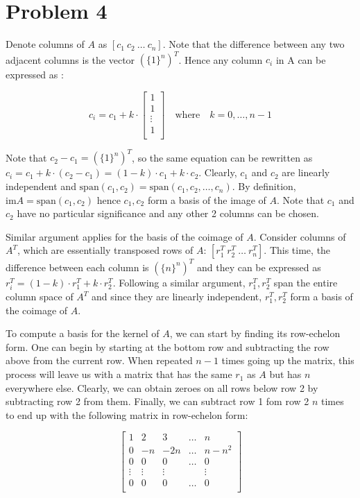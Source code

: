 \documentclass[10pt,letter]{article}
\begin{document}
\pagebreak

\section*{Problem 4}

Denote columns of $A$ as $\left[c_1\ c_2\ \ldots\ c_n\right]$. Note that the difference between any two adjacent columns is the vector $(\{1\}^n)^T$. Hence any column $c_i$ in A can be expressed as :

\[
c_i = c_1 + k \cdot 
\left[ {\begin{array}{c}
 1 \\
 1 \\
 \vdots \\
 1 \\
\end{array} } \right]
\quad \textrm{where} \quad k=0,\ldots ,n-1
\]

Note that $c_2 - c_1 = (\{1\}^n)^T$, so the same equation can be rewritten as $c_i = c_1 + k \cdot (c_2 - c_1) = (1 - k) \cdot c_1 + k \cdot c_2$. Clearly, $c_1$ and $c_2$ are linearly independent and $\textrm{span}(c_1, c_2) = \textrm{span}(c_1, c_2, \ldots, c_n)$. By definition, $\textrm{im}A = \textrm{span}(c_1, c_2)$ hence $c_1, c_2$ form a basis of the image of $A$. Note that $c_1$ and $c_2$ have no particular significance and any other 2 columns can be chosen.

Similar argument applies for the basis of the coimage of $A$. Consider columns of $A^T$, which are essentially transposed rows of $A$: $\left[r_1^T\ r_2^T\ \ldots\ r_n^T\right]$. This time, the difference between each column is $(\{n\}^n)^T$ and they can be expressed as $r_i^T = (1 - k) \cdot r_1^T + k \cdot r_2^T$. Following a similar argument, $r_1^T, r_2^T$ span the entire column space of $A^T$ and since they are linearly independent, $r_1^T, r_2^T$ form a basis of the coimage of $A$.

To compute a basis for the kernel of $A$, we can start by finding its row-echelon form. One can begin by starting at the bottom row and subtracting the row above from the current row. When repeated $n-1$ times going up the matrix, this process will leave us with a matrix that has the same $r_1$ as $A$ but has $n$ everywhere else. Clearly, we can obtain zeroes on all rows below row 2 by subtracting row 2 from them. Finally, we can subtract row 1 fom row 2 $n$ times to end up with the following matrix in row-echelon form:

\[
\left[ {\begin{array}{ccccc}
 1 & 2 & 3 & \ldots & n \\
 0 & -n & -2n & \ldots & n-n^2 \\
 0 & 0 & 0 &\ldots & 0 \\
 \vdots & \vdots & \vdots &  & \vdots \\
 0 & 0 & 0 & \ldots & 0 \\
\end{array} } \right]
\]
\end{document}
